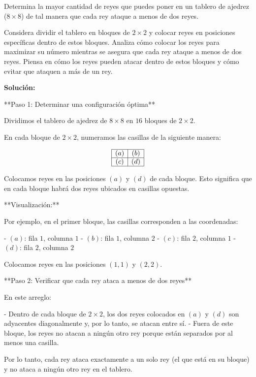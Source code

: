\documentclass[11pt]{scrartcl}
\begin{document}
\begin{problem}
Determina la mayor cantidad de reyes que puedes poner en un tablero de ajedrez ($8 \times 8$) de tal manera que cada rey ataque a menos de dos reyes.

\begin{hint}
Considera dividir el tablero en bloques de $2 \times 2$ y colocar reyes en posiciones específicas dentro de estos bloques. Analiza cómo colocar los reyes para maximizar su número mientras se asegura que cada rey ataque a menos de dos reyes. Piensa en cómo los reyes pueden atacar dentro de estos bloques y cómo evitar que ataquen a más de un rey.

\begin{solu}
\textbf{Solución:}

**Paso 1: Determinar una configuración óptima**

Dividimos el tablero de ajedrez de $8 \times 8$ en $16$ bloques de $2 \times 2$.

En cada bloque de $2 \times 2$, numeramos las casillas de la siguiente manera:

\[
\begin{array}{|c|c|}
\hline
(a) & (b) \\
\hline
(c) & (d) \\
\hline
\end{array}
\]

Colocamos reyes en las posiciones $(a)$ y $(d)$ de cada bloque. Esto significa que en cada bloque habrá dos reyes ubicados en casillas opuestas.

**Visualización:**

Por ejemplo, en el primer bloque, las casillas corresponden a las coordenadas:

- $(a)$: fila $1$, columna $1$
- $(b)$: fila $1$, columna $2$
- $(c)$: fila $2$, columna $1$
- $(d)$: fila $2$, columna $2$

Colocamos reyes en las posiciones $(1,1)$ y $(2,2)$.

**Paso 2: Verificar que cada rey ataca a menos de dos reyes**

En este arreglo:

- Dentro de cada bloque de $2 \times 2$, los dos reyes colocados en $(a)$ y $(d)$ son adyacentes diagonalmente y, por lo tanto, se atacan entre sí.
- Fuera de este bloque, los reyes no atacan a ningún otro rey porque están separados por al menos una casilla.

Por lo tanto, cada rey ataca exactamente a un solo rey (el que está en su bloque) y no ataca a ningún otro rey en el tablero.


\end{solu}
\end{hint}
\end{problem}
\end{document}
